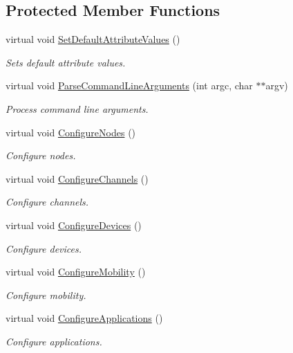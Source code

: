 \subsection*{Protected Member Functions}
\begin{DoxyCompactItemize}
\item 
virtual void \hyperlink{classWifiApp_aeff366712591e16d32a08a07a11b53cb}{Set\+Default\+Attribute\+Values} ()
\begin{DoxyCompactList}\small\item\em Sets default attribute values. \end{DoxyCompactList}\item 
virtual void \hyperlink{classWifiApp_a5b5615c4bf7856b9730528673228eea0}{Parse\+Command\+Line\+Arguments} (int argc, char $\ast$$\ast$argv)
\begin{DoxyCompactList}\small\item\em Process command line arguments. \end{DoxyCompactList}\item 
virtual void \hyperlink{classWifiApp_aa9f2613b65053b54e22a4bffc795782e}{Configure\+Nodes} ()
\begin{DoxyCompactList}\small\item\em Configure nodes. \end{DoxyCompactList}\item 
virtual void \hyperlink{classWifiApp_a5403723e14e754f18aa239e7e065bad6}{Configure\+Channels} ()
\begin{DoxyCompactList}\small\item\em Configure channels. \end{DoxyCompactList}\item 
virtual void \hyperlink{classWifiApp_aee8f24cd14672226889e0572fe3cc4e3}{Configure\+Devices} ()
\begin{DoxyCompactList}\small\item\em Configure devices. \end{DoxyCompactList}\item 
virtual void \hyperlink{classWifiApp_ae87293d372770735bf56f656aaac7124}{Configure\+Mobility} ()
\begin{DoxyCompactList}\small\item\em Configure mobility. \end{DoxyCompactList}\item 
virtual void \hyperlink{classWifiApp_acd6503492b29fd6fa8fdb5294f5c36b4}{Configure\+Applications} ()
\begin{DoxyCompactList}\small\item\em Configure applications. \end{DoxyCompactList}\item 
$$
\end{DoxyCompactItemize}
